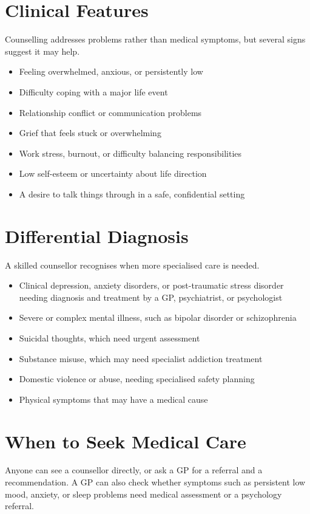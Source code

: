 \section*{Clinical Features}
Counselling addresses problems rather than medical symptoms, but several signs suggest it may help.

\begin{itemize}
    \item Feeling overwhelmed, anxious, or persistently low
    \item Difficulty coping with a major life event
    \item Relationship conflict or communication problems
    \item Grief that feels stuck or overwhelming
    \item Work stress, burnout, or difficulty balancing responsibilities
    \item Low self-esteem or uncertainty about life direction
    \item A desire to talk things through in a safe, confidential setting
\end{itemize}

\section*{Differential Diagnosis}
A skilled counsellor recognises when more specialised care is needed.

\begin{itemize}
    \item Clinical depression, anxiety disorders, or post-traumatic stress disorder needing diagnosis and treatment by a GP, psychiatrist, or psychologist
    \item Severe or complex mental illness, such as bipolar disorder or schizophrenia
    \item Suicidal thoughts, which need urgent assessment
    \item Substance misuse, which may need specialist addiction treatment
    \item Domestic violence or abuse, needing specialised safety planning
    \item Physical symptoms that may have a medical cause
\end{itemize}

\section*{When to Seek Medical Care}
Anyone can see a counsellor directly, or ask a GP for a referral and a recommendation. A GP can also check whether symptoms such as persistent low mood, anxiety, or sleep problems need medical assessment or a psychology referral.

